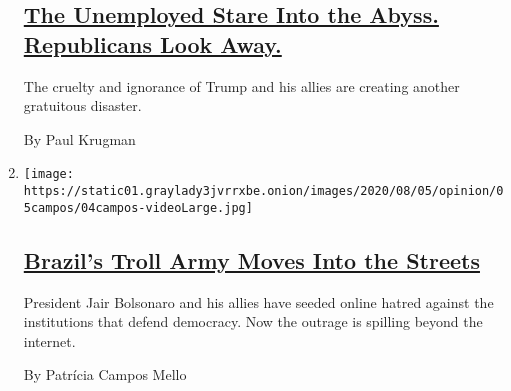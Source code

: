 \begin{enumerate}
  \hypertarget{the-unemployed-stare-into-the-abyss-republicans-look-away}{%
  \subsection{\texorpdfstring{\href{/2020/08/03/opinion/republicans-unemployed-coronavirus.html}{The
  Unemployed Stare Into the Abyss. Republicans Look
  Away.}}{The Unemployed Stare Into the Abyss. Republicans Look Away.}}\label{the-unemployed-stare-into-the-abyss-republicans-look-away}}

  The cruelty and ignorance of Trump and his allies are creating another
  gratuitous disaster.

  By Paul Krugman
\item
  \texttt{[image: https://static01.graylady3jvrrxbe.onion/images/2020/08/05/opinion/05campos/04campos-videoLarge.jpg]}

  \hypertarget{brazils-troll-army-moves-into-the-streets}{%
  \subsection{\texorpdfstring{\href{/2020/08/04/opinion/bolsonaro-office-of-hate-brazil.html}{Brazil's
  Troll Army Moves Into the
  Streets}}{Brazil's Troll Army Moves Into the Streets}}\label{brazils-troll-army-moves-into-the-streets}}

  President Jair Bolsonaro and his allies have seeded online hatred
  against the institutions that defend democracy. Now the outrage is
  spilling beyond the internet.

  By Patrícia Campos Mello
\end{enumerate}

